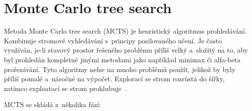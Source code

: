 \section{Monte Carlo tree search}\label{subsec:monte-carlo-tree-search}
Metoda Monte Carlo tree search (MCTS) je heuristický algoritmus prohledávání.
Kombinuje stromové vyhledávání s~principy posilovaného učení.
Je často využíván, je-li stavový prostor řešeného problému příliš velký a~složitý na to, aby byl prohledán kompletně jinými metodami jako například minimax či alfa-beta prořezávání.
Tyto  algoritmy nelze na mnoho problémů použít, jelikož by byly příliš pomalé a~náročné na výpočet.
Explorací se strom rozrůstá do šířky, zatímco exploatací se strom prohlubuje~\cite{mcts_geeksforgeeks}.

MCTS se skládá z~několika fází:

